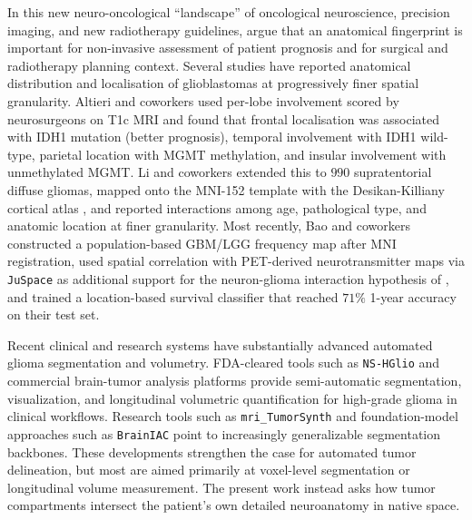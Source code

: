 \documentclass[a4paper,11pt,leqno]{article}
\begin{document}
In this new neuro-oncological ``landscape'' of oncological neuroscience, precision imaging, and new radiotherapy guidelines, \cite{DeLuca2022} argue that an anatomical fingerprint is important for non-invasive assessment of patient prognosis and for surgical and radiotherapy planning context.
Several studies have reported anatomical distribution and localisation
of glioblastomas at progressively finer spatial granularity. Altieri and
coworkers \cite{Altieri2018} used per-lobe involvement scored by
neurosurgeons on T1c MRI and found that frontal localisation was
associated with IDH1 mutation (better prognosis), temporal involvement
with IDH1 wild-type, parietal location with MGMT methylation, and
insular involvement with unmethylated MGMT. Li and coworkers
\cite{Li2023} extended this to $990$ supratentorial diffuse gliomas,
mapped onto the MNI-152 template \cite{Mazziotta1995} with the
Desikan-Killiany cortical atlas \cite{Desikan2006}, and reported
interactions among age, pathological type, and anatomic location at
finer granularity. Most recently, Bao and coworkers \cite{Bao2023}
constructed a population-based GBM/LGG frequency map after MNI
registration, used spatial correlation with PET-derived neurotransmitter
maps via \texttt{JuSpace} \cite{Dukart2021} as additional support for the
neuron-glioma interaction hypothesis of \cite{Krishna2023}, and trained
a location-based survival classifier that reached $71\%$ 1-year accuracy
on their test set.

Recent clinical and research systems have substantially advanced
automated glioma segmentation and volumetry. FDA-cleared tools such as
\texttt{NS-HGlio} \cite{Abayazeed2022NSHGlio,FDAK221738NSHGlio}
and commercial brain-tumor analysis platforms
\cite{CortechsNeuroQuantBrainTumor,FDAK241098NeuroQuant,FDAK233822MRIMath}
provide semi-automatic segmentation, visualization, and longitudinal
volumetric quantification for high-grade glioma in clinical workflows.
Research tools such as \texttt{mri\_TumorSynth}
\cite{Wu2026TumorSynth,PradosTumorSynthGitHub,FreeSurferTumorSynthWiki}
and foundation-model approaches such as \texttt{BrainIAC}
\cite{Tak2026BrainIAC,AIMKannLabBrainIACGitHub} point to increasingly
generalizable segmentation backbones. These developments strengthen the
case for automated tumor delineation, but most are aimed primarily at
voxel-level segmentation or longitudinal volume measurement. The present work instead asks how tumor compartments intersect the patient's
own detailed neuroanatomy in native space.
\end{document}
